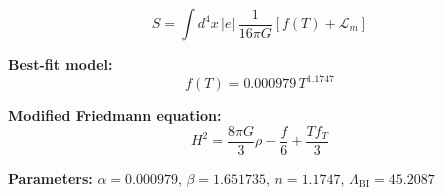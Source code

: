 
\begin{equation}
  S = \int d^4x \, |e| \, \frac{1}{16\pi G} \left[ f(T) + \mathcal{L}_m \right]
\end{equation}

\textbf{Best-fit model:}
\begin{equation}
  f(T) = 0.000979 \, T^{1.1747}
\end{equation}

\textbf{Modified Friedmann equation:}
\begin{equation}
  H^2 = \frac{8\pi G}{3} \rho - \frac{f}{6} + \frac{T f_T}{3}
\end{equation}

\textbf{Parameters:}
$\alpha = 0.000979$, \quad
$\beta = 1.651735$, \quad
$n = 1.1747$, \quad
$\Lambda_{\text{BI}} = 45.2087$